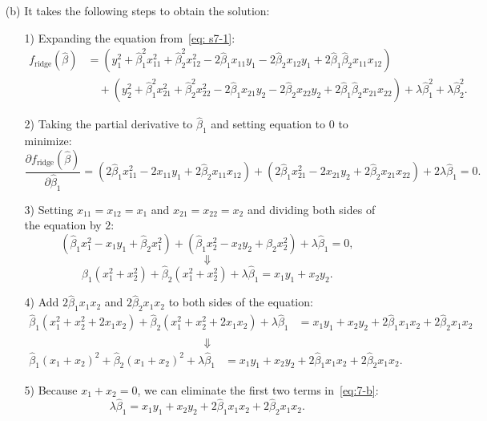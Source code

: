 \documentclass[10pt]{article}
\begin{document}
\begin{enumerate}[1.]
\begin{itemize}
    		\item[(b)] It takes the following steps to obtain the solution:
    		\begin{itemize}
    			\item[1)] Expanding the equation from~\eqref{eq: s7-1}:
    			\begin{equation*}
    			\begin{aligned}
    				f_{\textrm{ridge}}(\hat{\beta}) &= (y_1^2 + \hat{\beta}_1^2 x_{11}^2 + \hat{\beta}_2^2 x_{12}^2 - 2 \hat{\beta}_1 x_{11} y_1 - 2 \hat{\beta}_2 x_{12} y_1 + 2 \hat{\beta}_1 \hat{\beta}_2 x_{11} x_{12}) \\
    				&\quad+ (y_2^2 + \hat{\beta}_1^2 x_{21}^2 + \hat{\beta}_2^2 x_{22}^2 - 2 \hat{\beta}_1 x_{21} y_2 - 2 \hat{\beta}_2 x_{22} y_2 + 2 \hat{\beta}_1 \hat{\beta}_2 x_{21} x_{22}) 
    				+ \lambda \hat{\beta}_1^2 + \lambda \hat{\beta}_2^2.
    				\end{aligned}
    			\end{equation*}
    			\item[2)] Taking the partial derivative to $\hat{\beta}_1$ and setting equation to 0 to minimize:
    			$$\frac{\partial f_{\textrm{ridge}}(\hat{\beta})}{\partial \hat{\beta}_1}= (2\hat{\beta}_1x_{11}^2-2x_{11}y_1+2\hat{\beta}_2x_{11}x_{12}) + (2\hat{\beta}_1x_{21}^2-2x_{21}y_2+2\hat{\beta}_2x_{21}x_{22}) + 2\lambda\hat{\beta}_1 = 0.$$
    			
    			\item[3)] Setting $x_{11}=x_{12}=x_{1}$ and $x_{21}=x_{22}=x_{2}$ and dividing both sides of the equation by $2$:
    			$$(\hat{\beta}_1x_1^2-x_1y_1+\hat{\beta}_2x_1^2) + (\hat{\beta}_1x_2^2-x_2y_2+\hat{\beta}_2x_2^2) + \lambda\hat{\beta}_1 = 0,$$
    			$$\Downarrow$$
    			$$\hat{\beta}_1 (x_1^2+x_2^2) + \hat{\beta}_2 (x_1^2+x_2^2) + \lambda\hat{\beta}_1 = x_1y_1 + x_2y_2.$$
    			
    			\item[4)] Add $2\hat{\beta}_1x_1x_2$ and $2\hat{\beta}_2x_1x_2$ to both sides of the equation:
    			\begin{equation*}
    				\begin{aligned}
	    				\hat{\beta}_1 (x_1^2 + x_2^2 + 2x_1x_2) + \hat{\beta}_2 (x_1^2 + x_2^2 + 2x_1x_2) + \lambda\hat{\beta}_1 &= x_1y_1 + x_2y_2 + 2\hat{\beta}_1x_1x_2 + 2\hat{\beta}_2x_1x_2 \\
    				\end{aligned}
    			\end{equation*}
    			$$\Downarrow$$
    			\begin{equation}\label{eq:7-b}
    				\begin{aligned}
    				\hat{\beta}_1 (x_1 + x_2)^2 + \hat{\beta}_2 (x_1 + x_2)^2 + \lambda\hat{\beta}_1 &= x_1y_1 + x_2y_2 + 2\hat{\beta}_1x_1x_2 + 2\hat{\beta}_2x_1x_2.
    				\end{aligned}
    			\end{equation}
    			\item[5)] Because $x_1+x_2=0$, we can eliminate the first two terms in~\eqref{eq:7-b}:
    			$$\lambda\hat{\beta}_1 = x_1y_1 + x_2y_2 + 2\hat{\beta}_1x_1x_2 + 2\hat{\beta}_2x_1x_2.$$
    			

\end{itemize}
\end{itemize}
\end{enumerate}
\end{document}
